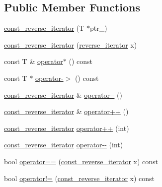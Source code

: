 \subsection*{Public Member Functions}
\begin{DoxyCompactItemize}
\item 
\mbox{\hyperlink{classprevector_1_1const__reverse__iterator_a8317a6e533f8ff746c935826be41446c}{const\+\_\+reverse\+\_\+iterator}} (T $\ast$ptr\+\_\+)
\item 
\mbox{\hyperlink{classprevector_1_1const__reverse__iterator_aa30b052fbfc36a374d6f97afda55cb2b}{const\+\_\+reverse\+\_\+iterator}} (\mbox{\hyperlink{classprevector_1_1reverse__iterator}{reverse\+\_\+iterator}} x)
\item 
const T \& \mbox{\hyperlink{classprevector_1_1const__reverse__iterator_a1bb2c8ee18fc05421f6fa6d1026d4555}{operator$\ast$}} () const
\item 
const T $\ast$ \mbox{\hyperlink{classprevector_1_1const__reverse__iterator_a3f9ff7d9e7dcb7cc11e1a7eb37f4e328}{operator-\/$>$}} () const
\item 
\mbox{\hyperlink{classprevector_1_1const__reverse__iterator}{const\+\_\+reverse\+\_\+iterator}} \& \mbox{\hyperlink{classprevector_1_1const__reverse__iterator_a1a198a8ca421768877d2feddcd89ac21}{operator-\/-\/}} ()
\item 
\mbox{\hyperlink{classprevector_1_1const__reverse__iterator}{const\+\_\+reverse\+\_\+iterator}} \& \mbox{\hyperlink{classprevector_1_1const__reverse__iterator_a0743ad35bd5713098bb17f082e8e8b3d}{operator++}} ()
\item 
\mbox{\hyperlink{classprevector_1_1const__reverse__iterator}{const\+\_\+reverse\+\_\+iterator}} \mbox{\hyperlink{classprevector_1_1const__reverse__iterator_a6e920ffb848590d1637e88b68c6b00ce}{operator++}} (int)
\item 
\mbox{\hyperlink{classprevector_1_1const__reverse__iterator}{const\+\_\+reverse\+\_\+iterator}} \mbox{\hyperlink{classprevector_1_1const__reverse__iterator_a575758594e8e2f63d1fd6228192c054a}{operator-\/-\/}} (int)
\item 
bool \mbox{\hyperlink{classprevector_1_1const__reverse__iterator_adde47c930cc199ee6432405f1f376c14}{operator==}} (\mbox{\hyperlink{classprevector_1_1const__reverse__iterator}{const\+\_\+reverse\+\_\+iterator}} x) const
\item 
bool \mbox{\hyperlink{classprevector_1_1const__reverse__iterator_ad1da739c0adfa0624b3c99161ad46810}{operator!=}} (\mbox{\hyperlink{classprevector_1_1const__reverse__iterator}{const\+\_\+reverse\+\_\+iterator}} x) const
\end{DoxyCompactItemize}
